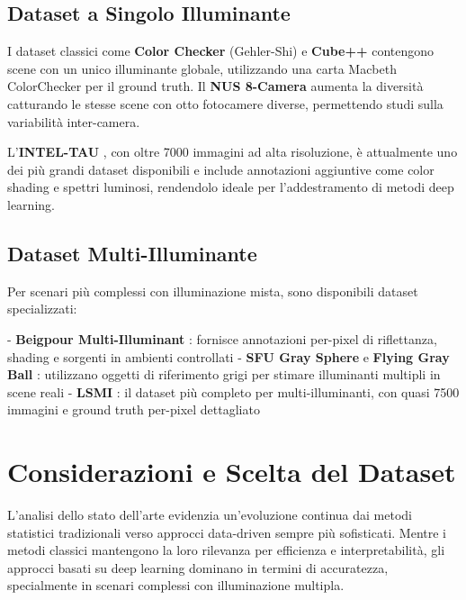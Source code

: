 \subsection{Dataset a Singolo Illuminante}

I dataset classici come \textbf{Color Checker} (Gehler-Shi) \cite{gehler_bayesian_2008} e \textbf{Cube++} \cite{ershov_cube_2020} contengono scene con un unico illuminante globale, utilizzando una carta Macbeth ColorChecker per il ground truth. Il \textbf{NUS 8-Camera} \cite{cheng_illuminant_2014} aumenta la diversità catturando le stesse scene con otto fotocamere diverse, permettendo studi sulla variabilità inter-camera.

L'\textbf{INTEL-TAU} \cite{laakom_intel-tau_2020}, con oltre 7000 immagini ad alta risoluzione, è attualmente uno dei più grandi dataset disponibili e include annotazioni aggiuntive come color shading e spettri luminosi, rendendolo ideale per l'addestramento di metodi deep learning.

\subsection{Dataset Multi-Illuminante}

Per scenari più complessi con illuminazione mista, sono disponibili dataset specializzati:

- \textbf{Beigpour Multi-Illuminant} \cite{beigpour_multi-illuminant_2013}: fornisce annotazioni per-pixel di riflettanza, shading e sorgenti in ambienti controllati
- \textbf{SFU Gray Sphere} e \textbf{Flying Gray Ball} \cite{ciurea_large_2003,aghaei_flying_2020}: utilizzano oggetti di riferimento grigi per stimare illuminanti multipli in scene reali
- \textbf{LSMI} \cite{kim_large_2021}: il dataset più completo per multi-illuminanti, con quasi 7500 immagini e ground truth per-pixel dettagliato

\section{Considerazioni e Scelta del Dataset}\label{sec:scelta_dataset}

L'analisi dello stato dell'arte evidenzia un'evoluzione continua dai metodi statistici tradizionali verso approcci data-driven sempre più sofisticati. Mentre i metodi classici mantengono la loro rilevanza per efficienza e interpretabilità, gli approcci basati su deep learning dominano in termini di accuratezza, specialmente in scenari complessi con illuminazione multipla.

